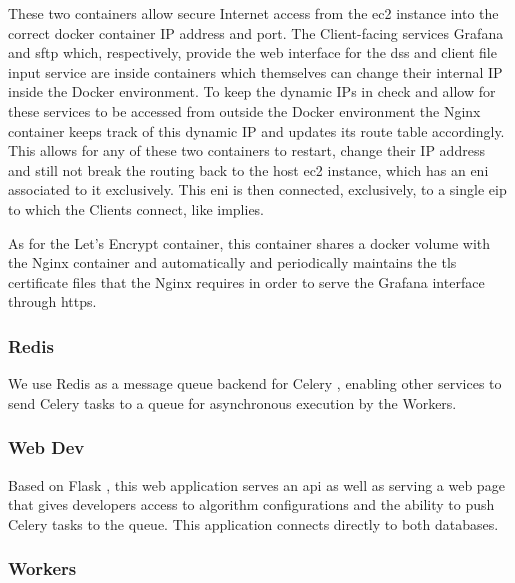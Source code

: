 These two containers allow secure Internet access from the \gls{ec2} instance into the correct docker container IP address and port. The Client-facing services Grafana and \gls{sftp} which, respectively, provide the web interface for the \gls{dss} and client file input service are inside containers which themselves can change their internal IP inside the Docker environment. To keep the dynamic IPs in check and allow for these services to be accessed from outside the Docker environment the Nginx container keeps track of this dynamic IP and updates its route table accordingly. This allows for any of these two containers to restart, change their IP address and still not break the routing back to the host \gls{ec2} instance, which has an \gls{eni} associated to it exclusively. This \gls{eni} is then connected, exclusively, to a single \gls{eip} to which the Clients connect, like  implies.

As for the Let's Encrypt container, this container shares a docker volume with the Nginx container and automatically and periodically maintains the \gls{tls} certificate files that the Nginx requires in order to serve the Grafana interface through \gls{https}. 


\subsubsection{Redis}\label{methodology:sss:redis}

We use Redis \parencite{redis_2022} as a message queue backend for Celery \parencite{celery}, enabling other services to send Celery tasks to a queue for asynchronous execution by the Workers.

\subsubsection{Web Dev}\label{methodology:sss:webdev}

Based on Flask \parencite{pallets_2022}, this web application serves an \gls{api} as well as serving a web page that gives developers access to algorithm configurations and the ability to push Celery tasks to the queue. This application connects directly to both databases.

\subsubsection{Workers}\label{methodology:sss:workers}

